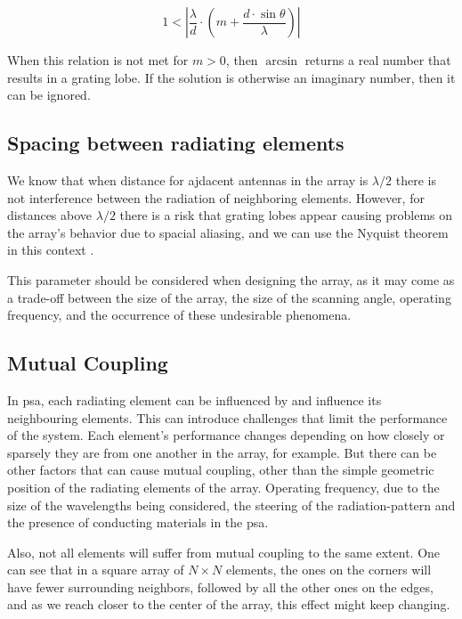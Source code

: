 \begin{equation}
    \label{ch2_gratinglobescondition}
    1 < \left|\frac{\lambda}{d}\cdot \left( m + \frac{d\cdot\sin{\theta}}{\lambda} \right)\right|
\end{equation}

\par When this relation is not met for $m > 0$, then $\arcsin$ returns a real number that results in a grating lobe. If the solution is otherwise an imaginary number, then it can be ignored. 

\subsection{Spacing between radiating elements}
\par We know that when distance for ajdacent antennas in the array is $\lambda/2$ there is not interference between the radiation of neighboring elements. However, for distances above $\lambda/2$ there is a risk that grating lobes appear causing problems on the array's behavior due to spacial aliasing, and we can use the Nyquist theorem in this context \cite{Delos2020PhasedSquint}. 

\par This parameter should be considered when designing the array, as it may come as a trade-off between the size of the array, the size of the scanning angle, operating frequency, and the occurrence of these undesirable phenomena.

\subsection{Mutual Coupling}
\par In \ac{psa}, each radiating element can be influenced by and influence its neighbouring elements. This can introduce challenges that limit the performance of the system. Each element's performance changes depending on how closely or sparsely they are from one another in the array, for example. But there can be other factors that can cause mutual coupling, other than the simple geometric position of the radiating elements of the array. Operating frequency, due to the size of the wavelengths being considered, the steering of the radiation-pattern and the presence of conducting materials in the \ac{psa}.

\par Also, not all elements will suffer from mutual coupling to the same extent. One can see that in a square array of $N\times N$ elements, the ones on the corners will have fewer surrounding neighbors, followed by all the other ones on the edges, and as we reach closer to the center of the array, this effect might keep changing. 

